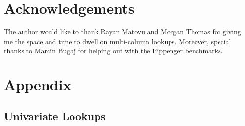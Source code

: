 \documentclass[11pt]{article}
\theoremstyle{definition}
\theoremstyle{remark}
\begin{document}
\section{Acknowledgements}

The author would like to thank Rayan Matovu and Morgan Thomas for giving me the space and time to dwell on multi-column lookups. 
Moreover, special thanks to Marcin Bugaj for helping out with the Pippenger benchmarks.






\appendix
\section{Appendix}
\label{s:appendix}


\subsection{Univariate Lookups}
\label{s:uv:lookup}
\end{document}
